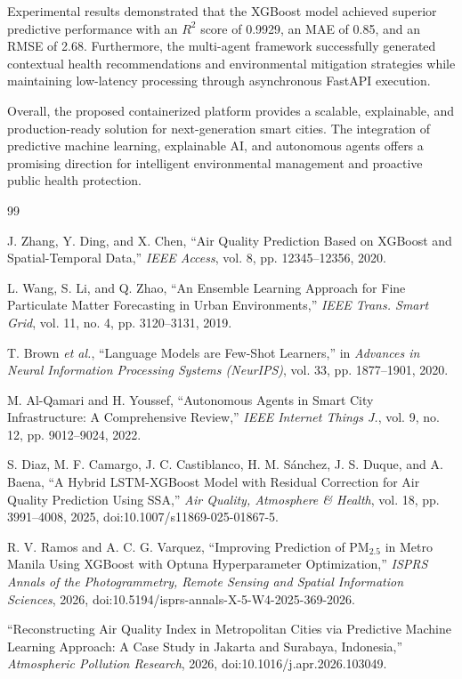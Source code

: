 \documentclass[conference]{IEEEtran}
\begin{document}
Experimental results demonstrated that the XGBoost model
achieved superior predictive performance with an $R^2$
score of 0.9929, an MAE of 0.85, and an RMSE of 2.68.
Furthermore, the multi-agent framework successfully
generated contextual health recommendations and
environmental mitigation strategies while maintaining
low-latency processing through asynchronous FastAPI
execution.

Overall, the proposed containerized platform provides a
scalable, explainable, and production-ready solution for
next-generation smart cities. The integration of predictive
machine learning, explainable AI, and autonomous agents
offers a promising direction for intelligent environmental
management and proactive public health protection.

\begin{thebibliography}{99}

J. Zhang, Y. Ding, and X. Chen, ``Air Quality Prediction Based on XGBoost and Spatial-Temporal Data,'' \emph{IEEE Access}, vol. 8, pp. 12345--12356, 2020.

L. Wang, S. Li, and Q. Zhao, ``An Ensemble Learning Approach for Fine Particulate Matter Forecasting in Urban Environments,'' \emph{IEEE Trans. Smart Grid}, vol. 11, no. 4, pp. 3120--3131, 2019.

T. Brown \emph{et al.}, ``Language Models are Few-Shot Learners,'' in \emph{Advances in Neural Information Processing Systems (NeurIPS)}, vol. 33, pp. 1877--1901, 2020.

M. Al-Qamari and H. Youssef, ``Autonomous Agents in Smart City Infrastructure: A Comprehensive Review,'' \emph{IEEE Internet Things J.}, vol. 9, no. 12, pp. 9012--9024, 2022.

S. Diaz, M. F. Camargo, J. C. Castiblanco, H. M. Sánchez, J. S. Duque, and A. Baena, ``A Hybrid LSTM-XGBoost Model with Residual Correction for Air Quality Prediction Using SSA,'' \emph{Air Quality, Atmosphere \& Health}, vol. 18, pp. 3991--4008, 2025, doi:10.1007/s11869-025-01867-5.

R. V. Ramos and A. C. G. Varquez, ``Improving Prediction of PM$_{2.5}$ in Metro Manila Using XGBoost with Optuna Hyperparameter Optimization,'' \emph{ISPRS Annals of the Photogrammetry, Remote Sensing and Spatial Information Sciences}, 2026, doi:10.5194/isprs-annals-X-5-W4-2025-369-2026.

``Reconstructing Air Quality Index in Metropolitan Cities via Predictive Machine Learning Approach: A Case Study in Jakarta and Surabaya, Indonesia,'' \emph{Atmospheric Pollution Research}, 2026, doi:10.1016/j.apr.2026.103049.


\end{thebibliography}
\end{document}
